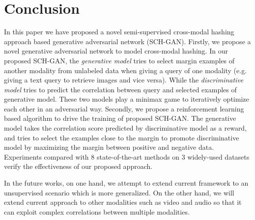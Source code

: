 \documentclass[journal]{IEEEtran}
\begin{document}
\section{Conclusion}
In this paper we have proposed a novel semi-supervised cross-modal hashing approach based generative adversarial network (SCH-GAN). Firstly, we propose a novel generative adversarial network to model cross-modal hashing. In our proposed SCH-GAN, the \textit{generative model} tries to select margin examples of another modality from unlabeled data when giving a query of one modality (e.g. giving a text query to retrieve images and vice versa). While the \textit{discriminative model} tries to predict the correlation between query and selected examples of generative model. These two models play a minimax game to iteratively optimize each other in an adversarial way.
Secondly, we propose a reinforcement learning based algorithm to drive the training of proposed SCH-GAN. The generative model takes the correlation score predicted by discriminative model as a reward, and tries to select the examples close to the margin to promote discriminative model by maximizing the margin between positive and negative data. Experiments compared with 8 state-of-the-art methods on 3 widely-used datasets verify the effectiveness of our proposed approach.

In the future works, on one hand, we attempt to extend current framework to an unsupervised scenario which is more generalized. On the other hand, we will extend current approach to other modalities such as video and audio so that it can exploit complex correlations between multiple modalities.

\ifCLASSOPTIONcaptionsoff
  \newpage
\fi







\end{document}
